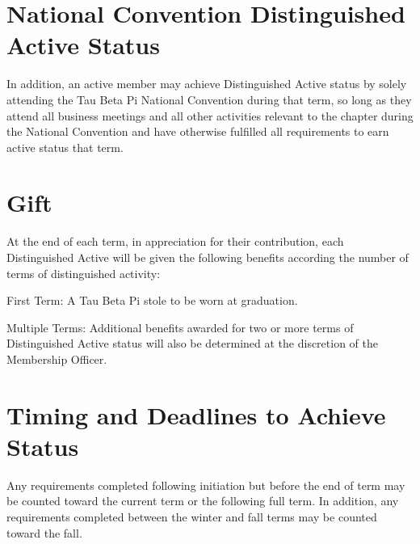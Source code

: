 \section{National Convention Distinguished Active Status}
In addition, an active member may achieve Distinguished Active status by solely attending the Tau Beta Pi National Convention during that term, so long as they attend all business meetings and all other activities relevant to the chapter during the National Convention and have otherwise fulfilled all requirements to earn active status that term.
\section{Gift}
At the end of each term, in appreciation for their contribution, each Distinguished Active will be given the following benefits according the number of terms of distinguished activity:
\begin{enumsubsection}
\item{First Term:}
A Tau Beta Pi stole to be worn at graduation.
\item{Multiple Terms:}
Additional benefits awarded for two or more terms of Distinguished Active status will also be determined at the discretion of the Membership Officer.
\end{enumsubsection}
\section{Timing and Deadlines to Achieve Status}
Any requirements completed following initiation but before the end of term may be counted toward the current term or the following full term.
In addition, any requirements completed between the winter and fall terms may be counted toward the fall.
